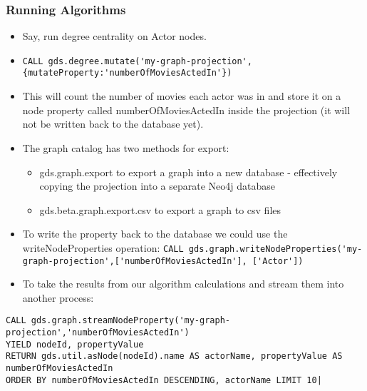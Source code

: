 \begin{frame}[fragile]\frametitle{Running Algorithms}

\begin{itemize}
\item Say, run degree centrality on Actor nodes. 
\item \lstinline|CALL gds.degree.mutate('my-graph-projection', {mutateProperty:'numberOfMoviesActedIn'})|
\item This will count the number of movies each actor was in and store it on a node property called numberOfMoviesActedIn inside the projection (it will not be written back to the database yet).
\item The graph catalog has two methods for export:
\begin{itemize}
\item gds.graph.export to export a graph into a new database - effectively copying the projection into a separate Neo4j database
\item 
gds.beta.graph.export.csv to export a graph to csv files
\end{itemize}

\item  To write the property back to the database we could use the writeNodeProperties operation: \lstinline|CALL gds.graph.writeNodeProperties('my-graph-projection',['numberOfMoviesActedIn'], ['Actor'])|
\item To take the results from our algorithm calculations and stream them into another process:
\end{itemize}

\begin{lstlisting}
CALL gds.graph.streamNodeProperty('my-graph-projection','numberOfMoviesActedIn')
YIELD nodeId, propertyValue
RETURN gds.util.asNode(nodeId).name AS actorName, propertyValue AS numberOfMoviesActedIn
ORDER BY numberOfMoviesActedIn DESCENDING, actorName LIMIT 10| 
\end{lstlisting}

\end{frame}


